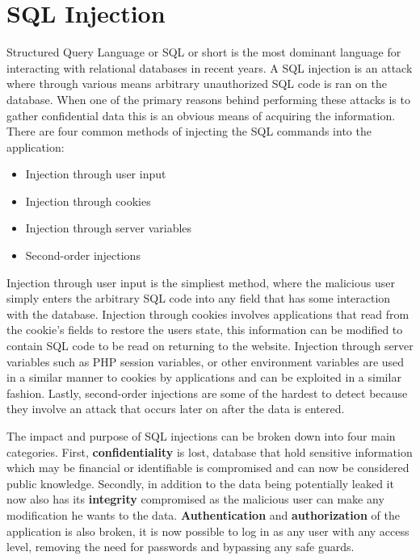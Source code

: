 \section{SQL Injection}
Structured Query Language or SQL or short is the most dominant language for interacting with relational databases in recent years.  A SQL injection is an attack where through various means arbitrary unauthorized SQL code is ran on the database.  When one of the primary reasons behind performing these attacks is to gather confidential data this is an obvious means of acquiring the information.%
There are four common methods of injecting the SQL commands into the application:

\begin{itemize}
	\item Injection through user input
	\item Injection through cookies
	\item Injection through server variables
	\item Second-order injections
\end{itemize}

Injection through user input is the simpliest method, where the malicious user simply enters the arbitrary SQL code into any field that has some interaction with the database.  Injection through cookies involves applications that read from the cookie's fields to restore the users state, this information can be modified to contain SQL code to be read on returning to the website.  Injection through server variables such as PHP session variables, or other environment variables are used in a similar manner to cookies by applications and can be exploited in a similar fashion.  Lastly, second-order injections are some of the hardest to detect because they involve an attack that occurs later on after the data is entered. %

The impact and purpose of SQL injections can be broken down into four main categories.  First, \textbf{confidentiality} is lost, database that hold sensitive information which may be financial or identifiable is compromised and can now be considered public knowledge. %
Secondly, in addition to the data being potentially leaked it now also has its \textbf{integrity} compromised as the malicious user can make any modification he wants to the data.  \textbf{Authentication} and \textbf{authorization} of the application is also broken, it is now possible to log in as any user with any access level, removing the need for passwords and bypassing any safe guards.

